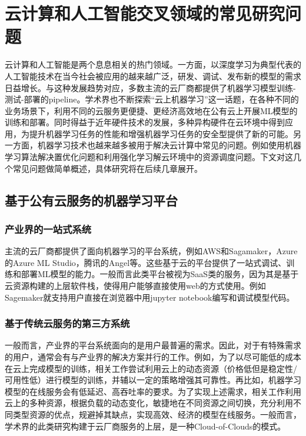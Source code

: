\section{云计算和人工智能交叉领域的常见研究问题}
云计算和人工智能是两个息息相关的热门领域。一方面，以深度学习为典型代表的人工智能技术在当今社会被应用的越来越广泛，研发、调试、发布新的模型的需求日益增长。与这种发展趋势对应，多数主流的云厂商都提供了机器学习模型训练-测试-部署的pipeline。学术界也不断探索“云上机器学习”这一话题，在各种不同的业务场景下，利用不同的云服务更便捷、更经济高效地在公有云上开展ML模型的训练和部署。同时得益于近年硬件技术的发展，多种异构硬件在云环境中得到应用，为提升机器学习任务的性能和增强机器学习任务的安全型提供了新的可能。另一方面，机器学习技术也越来越多被用于解决云计算中常见的问题。例如使用机器学习算法解决置优化问题和利用强化学习解云环境中的资源调度问题。下文对这几个常见问题做简单概述，具体研究将在后续几章展开。

\subsection{基于公有云服务的机器学习平台}
\subsubsection{产业界的一站式系统}

主流的云厂商都提供了面向机器学习的平台系统，例如AWS和Sagamaker\parencite{joshi2020amazon,liberty2020elastic,perrone2020amazon}，Azure的Azure ML Studio\parencite{etaati2019azure}，腾讯的Angel\parencite{jiang2018angel}等。这些基于云的平台提供了一站式调试、训练和部署ML模型的能力。一般而言此类平台被视为SaaS类的服务，因为其是基于云资源构建的上层软件栈，使得用户能够直接使用web的方式使用。例如Sagemaker就支持用户直接在浏览器中用jupyter notebook编写和调试模型代码。

\subsubsection{基于传统云服务的第三方系统}

一般而言，产业界的平台系统面向的是用户最普遍的需求。因此，对于有特殊需求的用户，通常会有与产业界的解决方案并行的工作。例如，为了以尽可能低的成本在云上完成模型的训练，相关工作\parencite{harlap2017proteus,li2020spottune}尝试利用云上的动态资源（价格低但是稳定性/可用性低）进行模型的训练，并辅以一定的策略增强其可靠性。再比如，机器学习模型的在线服务会有低延迟、高吞吐率的要求。为了实现上述需求，相关工作\parencite{zhang2019mark}利用云上的多种资源，根据负载的动态变化，敏捷地在不同资源之间切换，充分利用不同类型资源的优点，规避掉其缺点，实现高效、经济的模型在线服务。一般而言，学术界的此类研究构建于云厂商服务的上层，是一种Cloud-of-Clouds的模式。

